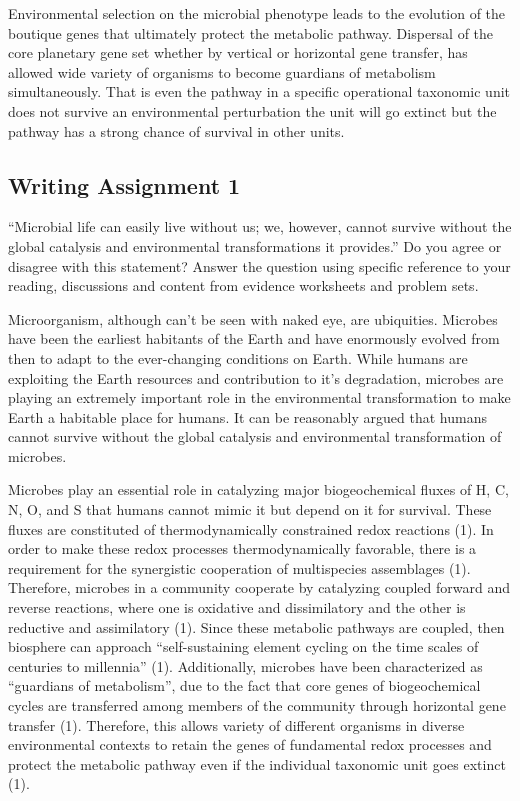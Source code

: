 \documentclass[]{article}
\begin{document}
Environmental selection on the microbial phenotype leads to the
evolution of the boutique genes that ultimately protect the metabolic
pathway. Dispersal of the core planetary gene set whether by vertical or
horizontal gene transfer, has allowed wide variety of organisms to
become guardians of metabolism simultaneously. That is even the pathway
in a specific operational taxonomic unit does not survive an
environmental perturbation the unit will go extinct but the pathway has
a strong chance of survival in other units.

\subsection{Writing Assignment 1}\label{writing-assignment-1}

``Microbial life can easily live without us; we, however, cannot survive
without the global catalysis and environmental transformations it
provides.'' Do you agree or disagree with this statement? Answer the
question using specific reference to your reading, discussions and
content from evidence worksheets and problem sets.

Microorganism, although can't be seen with naked eye, are ubiquities.
Microbes have been the earliest habitants of the Earth and have
enormously evolved from then to adapt to the ever-changing conditions on
Earth. While humans are exploiting the Earth resources and contribution
to it's degradation, microbes are playing an extremely important role in
the environmental transformation to make Earth a habitable place for
humans. It can be reasonably argued that humans cannot survive without
the global catalysis and environmental transformation of microbes.

Microbes play an essential role in catalyzing major biogeochemical
fluxes of H, C, N, O, and S that humans cannot mimic it but depend on it
for survival. These fluxes are constituted of thermodynamically
constrained redox reactions (1). In order to make these redox processes
thermodynamically favorable, there is a requirement for the synergistic
cooperation of multispecies assemblages (1). Therefore, microbes in a
community cooperate by catalyzing coupled forward and reverse reactions,
where one is oxidative and dissimilatory and the other is reductive and
assimilatory (1). Since these metabolic pathways are coupled, then
biosphere can approach ``self-sustaining element cycling on the time
scales of centuries to millennia'' (1). Additionally, microbes have been
characterized as ``guardians of metabolism'', due to the fact that core
genes of biogeochemical cycles are transferred among members of the
community through horizontal gene transfer (1). Therefore, this allows
variety of different organisms in diverse environmental contexts to
retain the genes of fundamental redox processes and protect the
metabolic pathway even if the individual taxonomic unit goes extinct
(1).
\end{document}
